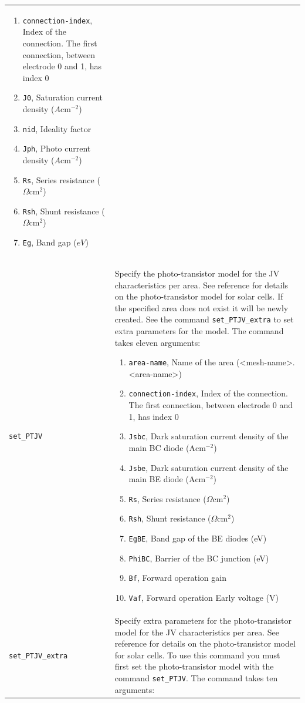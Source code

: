 \documentclass[noshowpacs,preprintnumbers,amsmath,amssymb, letter]{revtex4}
\begin{document}
\begin{longtable}{p{}p{}}
\begin{enumerate}
\item \texttt{connection-index}, Index of the connection. The first connection, between electrode 0 and 1,  has index 0
\item \texttt{J0}, Saturation current density ($A \text{cm}^{-2}$)
\item \texttt{nid}, Ideality factor
\item \texttt{Jph}, Photo current density ($A \text{cm}^{-2}$)
\item \texttt{Rs}, Series resistance ($\Omega \text{cm}^2$)
\item \texttt{Rsh}, Shunt resistance ($\Omega \text{cm}^2$)
\item \texttt{Eg}, Band gap ($eV$)
\end{enumerate}\\
\texttt{set\_PTJV}	&  Specify the photo-transistor model for the JV characteristics per area.  See reference \cite{Walter:photo-T} for details on the photo-transistor model for solar cells. If the specified area does not exist it will be newly created. See the command \texttt{set\_PTJV\_extra} to set extra parameters for the model. The command takes eleven arguments:
\begin{enumerate}
\item \texttt{area-name}, Name of the area (\textless mesh-name\textgreater .\textless area-name\textgreater )
\item \texttt{connection-index}, Index of the connection. The first connection, between electrode 0 and 1,  has index 0
\item \texttt{Jsbc},  Dark saturation current density of the main BC diode ($\text{A}\text{cm}^{-2}$)
\item \texttt{Jsbe},  Dark saturation current density of the main BE diode  ($\text{A}\text{cm}^{-2}$)
\item \texttt{Rs}, Series resistance ($\Omega \text{cm}^2$)
\item \texttt{Rsh}, Shunt resistance ($\Omega \text{cm}^2$)
\item \texttt{EgBE},  Band gap of the BE diodes (eV)
\item \texttt{PhiBC},  Barrier of the BC junction (eV)
\item \texttt{Bf},  Forward operation gain 
\item \texttt{Vaf},  Forward operation Early voltage (V)
\end{enumerate}\\
\texttt{set\_PTJV\_extra}	&  Specify extra parameters for the photo-transistor model for the JV characteristics per area. See reference \cite{Walter:photo-T} for details on the photo-transistor model for solar cells. To use this command you must first set the photo-transistor model with the command \texttt{set\_PTJV}. The command takes ten arguments:

\end{longtable}
\end{document}

